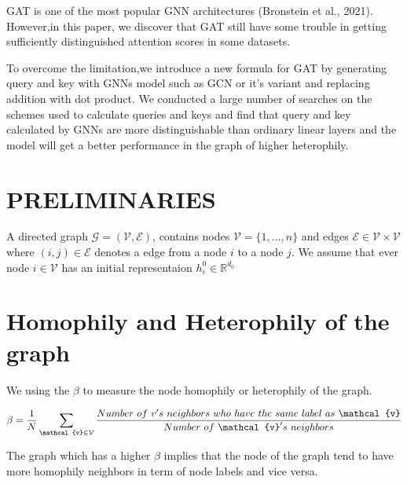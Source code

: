 \documentclass[letterpaper]{article} %
\begin{document}
GAT is one of the most popular GNN architectures (Bronstein et al., 2021). However,in this paper, we discover that GAT still have some trouble in getting sufficiently distinguished attention scores in some datasets. %

To overcome the limitation,we introduce a new formula for GAT by generating query and key with GNNs model such as GCN or it's variant and replacing addition with dot product. We conducted a large number of searches on the schemes used to calculate queries and keys and find that query and key calculated by GNNs are more distinguishable than ordinary linear layers and the model will get a better performance in the graph of higher heterophily.


\section{PRELIMINARIES}

A directed graph $\mathcal{G}=(\mathcal{V},\mathcal{E})$, contains nodes $\mathcal{V}=\{1,...,n\}$ and edges $\mathcal{E}\in \mathcal{V}\times\mathcal{V}$ where $(i,j)\in \mathcal{E}$ denotes a edge from a node $i$ to a node $j$. We assume that ever node $i\in \mathcal{V}$ has an initial representaion $h_i^{0}\in \mathbb{R}^{d_0}$
\section{ Homophily and Heterophily of the graph}
We using the $\beta$ to measure the node homophily or heterophily of the graph.%
{\small

\begin{equation}
    \beta =\frac{1}{N}\sum_{\mathcal{v}\in \mathcal{V}}\frac{
    Number\   of\   v's\   neighbors\ who\  have \  the\   same \  label \  as\   \mathcal{v} \\
    }{Number \  of\   \mathcal{v}'s \  neighbors}
\end{equation}
 }
The graph which has a higher $\beta$ implies that the node of the graph tend to have more homophily neighbors in term of node labels and vice versa.
\end{document}

